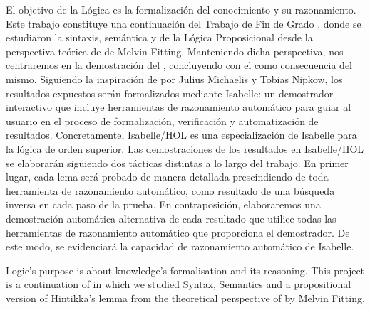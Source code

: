 %
\begin{isabellebody}%
%
%
\isadelimtheory
%
\endisadelimtheory
%
\isatagtheory
%
\endisatagtheory
{\isafoldtheory}%
%
\isadelimtheory
%
\endisadelimtheory
%
\begin{isamarkuptext}%
El objetivo de la Lógica es la formalización del conocimiento y su
razonamiento. Este trabajo constituye una continuación del Trabajo de Fin de
Grado , donde se estudiaron
la sintaxis, semántica y  de la Lógica Proposicional
desde la perspectiva teórica de  
 de Melvin Fitting. Manteniendo dicha perspectiva, nos centraremos en la 
demostración del , concluyendo con 
el  como consecuencia del mismo. Siguiendo la 
inspiración de   por Julius Michaelis y Tobias 
Nipkow, los resultados expuestos serán formalizados mediante Isabelle: un demostrador 
interactivo que incluye herramientas de razonamiento automático para guiar al usuario 
en el proceso de formalización, verificación y automatización de resultados. 
Concretamente, Isabelle/HOL es una especialización de Isabelle para la lógica de orden 
superior. Las demostraciones de los resultados en Isabelle/HOL se elaborarán siguiendo 
dos tácticas distintas a lo largo del trabajo. En primer lugar, cada lema será probado 
de manera detallada prescindiendo de toda herramienta de razonamiento automático, como 
resultado de una búsqueda inversa en cada paso de la prueba. En contraposición, 
elaboraremos una demostración automática alternativa de cada resultado que utilice todas 
las herramientas de razonamiento automático que proporciona el demostrador. De este modo, 
se evidenciará la capacidad de razonamiento automático de Isabelle.%
\end{isamarkuptext}\isamarkuptrue%
%
\begin{isamarkuptext}%
Logic’s purpose is about knowledge’s formalisation and its 
reasoning. This project is a continuation of  in which we studied Syntax, Semantics and
a propositional version of Hintikka's lemma from the theoretical perspective 
of   by Melvin Fitting. 

\end{isamarkuptext}
\end{isabellebody}
